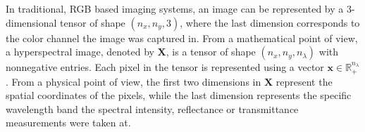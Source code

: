In traditional, RGB based imaging systems, an image can be represented by a 3-dimensional tensor of shape $(n_x, n_y, 3)$, where the last dimension corresponds to the color channel the image was captured in. From a mathematical point of view, a hyperspectral image, denoted by $\mathbf{X}$, is a tensor of shape $(n_x, n_y, n_\lambda)$ with nonnegative entries. Each pixel in the tensor is represented using a vector $\mathbf{x} \in \mathbb{R}_+^{n_\lambda}$. From a physical point of view, the first two dimensions in $\mathbf{X}$ represent the spatial coordinates  of the pixels, while the last dimension represents the specific wavelength band the spectral intensity, reflectance or transmittance measurements were taken at.
